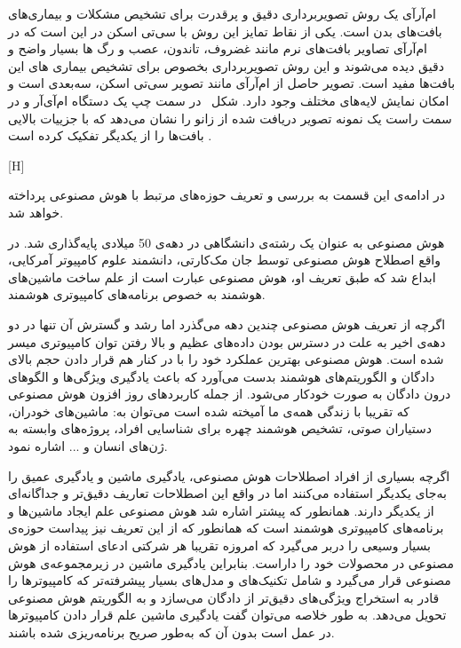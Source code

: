 ام‌آرآی یک روش تصویربرداری دقیق و پرقدرت برای تشخیص مشکلات و بیماری‌های بافت‌های بدن است. یکی از نقاط تمایز این روش با سی‌تی اسکن در این است که در ام‌آرآی تصاویر بافت‌های نرم مانند غضروف، تاندون، عصب و رگ ها بسیار واضح و دقیق دیده می‌شوند و این روش تصویربرداری بخصوص برای تشخیص بیماری های این بافت‌ها مفید است. تصویر حاصل از ام‌آر‌آی مانند تصویر سی‌تی اسکن، سه‌بعدی است و امکان نمایش لایه‌های مختلف وجود دارد. شکل~ در سمت چپ یک دستگاه ام‌آی‌آر و در سمت راست یک نمونه تصویر دریافت شده از زانو را نشان می‌دهد که با جزییات بالایی بافت‌ها را از یکدیگر تفکیک کرده است . 

[H]

در ادامه‌ی این قسمت به بررسی و تعریف حوزه‌های مرتبط با هوش مصنوعی پرداخته خواهد شد.

هوش مصنوعی به عنوان یک رشته‌ی دانشگاهی در دهه‌ی 50 میلادی پایه‌گذاری شد. در واقع اصطلاح هوش مصنوعی توسط جان مک‌کارتی، دانشمند علوم کامپیوتر آمرکایی، ابداع شد که طبق تعریف او، هوش مصنوعی عبارت است از علم ساخت ماشین‌های هوشمند به خصوص برنامه‌های کامپیوتری هوشمند.

اگرچه از تعریف هوش مصنوعی چندین دهه می‌گذرد اما رشد و گسترش آن تنها در دو دهه‌ی اخیر به علت در دسترس بودن داده‌های عظیم و بالا رفتن توان کامپیوتری میسر شده است. هوش مصنوعی بهترین عملکرد خود را با در کنار هم قرار دادن حجم بالای دادگان و الگوریتم‌های هوشمند بدست می‌آورد که باعث یادگیری ویژگی‌ها و الگوهای درون دادگان به صورت خودکار می‌شود. از جمله کاربردهای روز افزون هوش مصنوعی که تقریبا با زندگی همه‌ی ما آمیخته شده است می‌توان به: ماشین‌های خودران، دستیاران صوتی، تشخیص هوشمند چهره برای شناسایی افراد، پروژه‌های وابسته به ژن‌های انسان و ... اشاره نمود.

اگرچه بسیاری از افراد اصطلاحات هوش مصنوعی، یادگیری ماشین و یادگیری عمیق را به‌جای یکدیگر استفاده می‌کنند اما در واقع این اصطلاحات تعاریف دقیق‌تر و جداگانه‌ای از یکدیگر دارند. همانطور که پیشتر اشاره شد هوش مصنوعی علم ایجاد ماشین‌ها و برنامه‌های کامپیوتری هوشمند است که همانطور که از این تعریف نیز پیداست حوزه‌ی بسیار وسیعی را دربر می‌گیرد که امروزه تقریبا هر شرکتی ادعای استفاده از هوش مصنوعی در محصولات خود را داراست. بنابراین یادگیری ماشین در زیرمجموعه‌ی هوش مصنوعی قرار می‌گیرد و شامل تکنیک‌های و مدل‌های بسیار پیشرفته‌تر که کامپیوترها را قادر به استخراج ویژگی‌های دقیق‌تر از دادگان می‌سازد و به الگوریتم هوش مصنوعی تحویل می‌دهد. به طور خلاصه می‌توان گفت یادگیری ماشین علم قرار دادن کامپیوترها در عمل است بدون آن که به‌طور صریح برنامه‌ریزی شده باشند.

